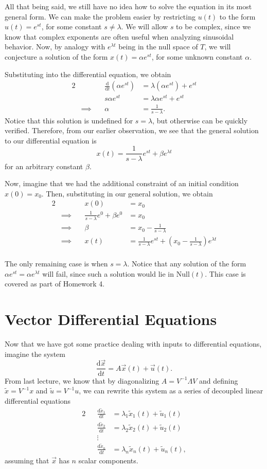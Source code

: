 \documentclass[letterpaper]{article}
\theoremstyle{remark}
\renewcommand{\tilde}[1]{\widetilde{#1}}
\newcommand{\dt}{\mathrm{d}t}
\newcommand{\diff}{\mathrm{d}}
\newcommand{\eqn}[1]{\begin{alignat*}{2}#1\end{alignat*}}
\newcommand*{\thus}{&\implies\quad&}
\begin{document}
All that being said, we still have no idea how to solve the equation in its most general form. We can make the problem easier by restricting $u(t)$ to the form $u(t) = e^{st}$, for some constant $s \ne \lambda$. We will allow $s$ to be complex, since we know that complex exponents are often useful when analyzing sinusoidal behavior. Now, by analogy with $e^{\lambda t}$ being in the null space of $T$, we will conjecture a solution of the form $x(t) = \alpha e^{st}$, for some unknown constant $\alpha$.

Substituting into the differential equation, we obtain
\eqn{
    && \frac{\diff}{\dt} (\alpha e^{st}) &= \lambda(\alpha e^{st}) + e^{st} \\
    && s\alpha e^{st} &= \lambda\alpha e^{st} + e^{st} \\
    \thus \alpha &= \frac{1}{s - \lambda}.
}
Notice that this solution is undefined for $s = \lambda$, but otherwise can be quickly verified. Therefore, from our earlier observation, we see that the general solution to our differential equation is
\[
    x(t) = \frac{1}{s - \lambda} e^{st} + \beta e^{\lambda t}
\]
for an arbitrary constant $\beta$.

Now, imagine that we had the additional constraint of an initial condition $x(0) = x_0$. Then, substituting in our general solution, we obtain
\eqn{
    && x(0) &= x_0 \\
    \thus \frac{1}{s - \lambda} e^{0} + \beta e^{0} &= x_0 \\
    \thus \beta &= x_0 - \frac{1}{s-\lambda} \\
    \thus x(t) &= \frac{1}{s - \lambda} e^{st} + \left( x_0 - \frac{1}{s-\lambda} \right)  e^{\lambda t} \\
}

The only remaining case is when $s = \lambda$. Notice that any solution of the form $\alpha e^{st} = \alpha e^{\lambda t}$ will fail, since such a solution would lie in $\text{Null}(t)$. This case is covered as part of Homework 4.

\section{Vector Differential Equations}
Now that we have got some practice dealing with inputs to differential equations, imagine the system
\[
    \frac{\diff \vec{x}}{\dt} = A\vec{x}(t) + \vec{u}(t).
\]
From last lecture, we know that by diagonalizing $A = V^{-1}\Lambda V$ and defining $\tilde{x} = V^{-1}x$ and $\tilde{u} = V^{-1}u$, we can rewrite this system as a series of decoupled linear differential equations
\eqn{
    && \frac{\diff \tilde{x}_1}{\dt} &= \lambda_1 \tilde{x}_1(t) + \tilde{u}_1(t) \\
    && \frac{\diff \tilde{x}_2}{\dt} &= \lambda_2 \tilde{x}_2(t) + \tilde{u}_2(t) \\
    && \vdots \\
    && \frac{\diff \tilde{x}_n}{\dt} &= \lambda_n \tilde{x}_n(t) + \tilde{u}_n(t),
}
assuming that $\vec{x}$ has $n$ scalar components. 
\end{document}
